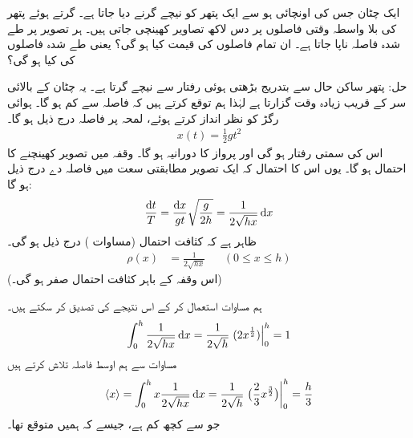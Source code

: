 ایک چٹان جس کی اونچائی  ہو سے ایک پتھر کو نیچے گرنے دیا جاتا ہے۔ گرتے ہوئے پتھر کی بلا واسطہ وقتی فاصلوں پر دس لاکھ تصاویر کھینچی جاتی ہیں۔ ہر تصویر پر طے شدہ فاصلہ ناپا جاتا ہے۔ ان تمام فاصلوں کی قیمت کیا ہو گی؟ یعنی طے شدہ فاصلوں کی  کیا ہو گی؟ 

حل: \quad
پتھر ساکن حال سے بتدریج بڑھتی ہوئی رفتار سے نیچے گرتا ہے۔ یہ چٹان کے بالائی سر کے قریب زیادہ وقت گزارتا ہے لہٰذا ہم توقع کرتے ہیں کہ
 فاصلہ  سے کم ہو گا۔ ہوائی رگڑ کو نظر انداز کرتے ہوئے، لمحہ  پر فاصلہ  درج ذیل ہو گا۔
\begin{align*}
 x(t) = \frac{1}{2} gt^2 
\end{align*}
اس کی سمتی رفتار  ہو گی اور پرواز کا دورانیہ  ہو گا۔ وقفہ  میں تصویر کھینچنے کا احتمال  ہو گا۔ یوں اس کا احتمال کہ ایک تصویر مطابقتی سعت  میں فاصلہ دے درج ذیل ہو گا:
 \begin{align*}
 \frac{\dif t}{T} = \frac{\dif x}{gt}\sqrt{\frac{g}{2h}} = \frac{1}{2\sqrt{hx}}\dif x
\end{align*} 
 ظاہر ہے کہ کثافت احتمال (مساوات ) درج ذیل ہو گی۔
 \begin{align*}
 \rho(x)&=\frac{1}{2\sqrt{hx}} && (0\leq x\leq h)
 \end{align*}
 (اس وقفہ کے باہر کثافت احتمال صفر ہو گی۔) 

ہم مساوات  استعمال کر کے اس نتیجے کی تصدیق کر سکتے ہیں۔
 \begin{align*}
 \int_0^h \frac{1}{2\sqrt{hx}}\dif x = \frac{1}{2\sqrt{h}}\left .(2x^{\frac{1}{2}})\right\vert_0^h =1
 \end{align*}
 مساوات  سے ہم اوسط فاصلہ تلاش کرتے ہیں
 \begin{align*}
 \langle x\rangle =\int_0^h x\frac{1}{2\sqrt{hx}}\dif x= \frac{1}{2\sqrt{h}} \left . \big(\frac{2}{3}x^{\frac{3}{2}}\big)\right\vert_0^h = \frac{h}{3}
 \end{align*}
 جو  سے کچھ کم ہے، جیسے کہ ہمیں متوقع تھا۔


